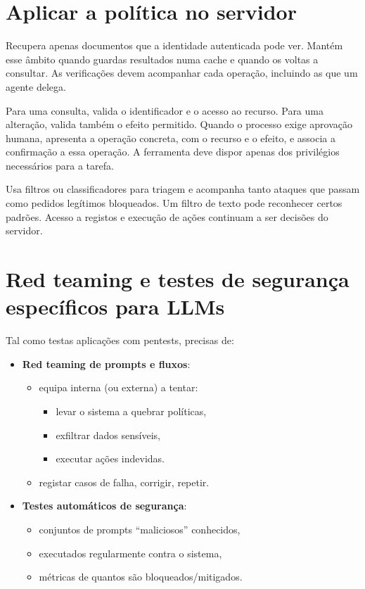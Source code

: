 \section{Aplicar a política no servidor}
Recupera apenas documentos que a identidade autenticada pode ver. Mantém esse âmbito quando guardas resultados numa cache e quando os voltas a consultar. As verificações devem acompanhar cada operação, incluindo as que um agente delega.

Para uma consulta, valida o identificador e o acesso ao recurso. Para uma alteração, valida também o efeito permitido. Quando o processo exige aprovação humana, apresenta a operação concreta, com o recurso e o efeito, e associa a confirmação a essa operação. A ferramenta deve dispor apenas dos privilégios necessários para a tarefa.

Usa filtros ou classificadores para triagem e acompanha tanto ataques que passam como pedidos legítimos bloqueados. Um filtro de texto pode reconhecer certos padrões. Acesso a registos e execução de ações continuam a ser decisões do servidor.

\section{Red teaming e testes de segurança específicos para LLMs}

Tal como testas aplicações com pentests, precisas de:

\begin{itemize}[leftmargin=*]
\item \textbf{Red teaming de prompts e fluxos}:
\begin{itemize}[leftmargin=*]
\item equipa interna (ou externa) a tentar:
\begin{itemize}[leftmargin=*]
\item levar o sistema a quebrar políticas,
\item exfiltrar dados sensíveis,
\item executar ações indevidas.
\end{itemize}
\item registar casos de falha, corrigir, repetir.
\end{itemize}
\item \textbf{Testes automáticos de segurança}:
\begin{itemize}[leftmargin=*]
\item conjuntos de prompts “maliciosos” conhecidos,
\item executados regularmente contra o sistema,
\item métricas de quantos são bloqueados/mitigados.
\end{itemize}
\end{itemize}

